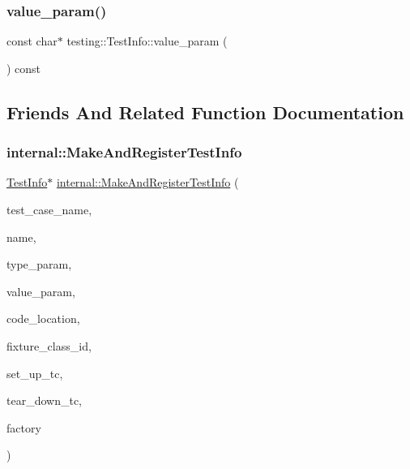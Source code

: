 \subsubsection{\texorpdfstring{value\_param()}{value\_param()}}
{\footnotesize\ttfamily const char$\ast$ testing\+::\+Test\+Info\+::value\+\_\+param (\begin{DoxyParamCaption}{ }\end{DoxyParamCaption}) const\hspace{0.3cm}{\ttfamily [inline]}}



\subsection{Friends And Related Function Documentation}
\mbox{\label{classtesting_1_1TestInfo_a70ddf8a12d8c05f17429f6381abc8ace}} 
\subsubsection{\texorpdfstring{internal::MakeAndRegisterTestInfo}{internal::MakeAndRegisterTestInfo}}
{\footnotesize\ttfamily \mbox{\hyperlink{classtesting_1_1TestInfo}{Test\+Info}}$\ast$ \mbox{\hyperlink{namespacetesting_1_1internal_a7f2e4e46c969fcae9d801d93a3e932fd}{internal\+::\+Make\+And\+Register\+Test\+Info}} (\begin{DoxyParamCaption}\item[{const char $\ast$}]{test\+\_\+case\+\_\+name,  }\item[{const char $\ast$}]{name,  }\item[{const char $\ast$}]{type\+\_\+param,  }\item[{const char $\ast$}]{value\+\_\+param,  }\item[{\mbox{\hyperlink{structtesting_1_1internal_1_1CodeLocation}{internal\+::\+Code\+Location}}}]{code\+\_\+location,  }\item[{\mbox{\hyperlink{namespacetesting_1_1internal_ab1114197d3c657d8b7f8e0c5caa12d00}{internal\+::\+Type\+Id}}}]{fixture\+\_\+class\+\_\+id,  }\item[{\mbox{\hyperlink{classtesting_1_1Test_a5f2a051d1d99c9b784c666c586186cf9}{Test\+::\+Set\+Up\+Test\+Case\+Func}}}]{set\+\_\+up\+\_\+tc,  }\item[{\mbox{\hyperlink{classtesting_1_1Test_aa0f532e93b9f3500144c53f31466976c}{Test\+::\+Tear\+Down\+Test\+Case\+Func}}}]{tear\+\_\+down\+\_\+tc,  }\item[{\mbox{\hyperlink{classtesting_1_1internal_1_1TestFactoryBase}{internal\+::\+Test\+Factory\+Base}} $\ast$}]{factory }\end{DoxyParamCaption})\hspace{0.3cm}{\ttfamily [friend]}}

